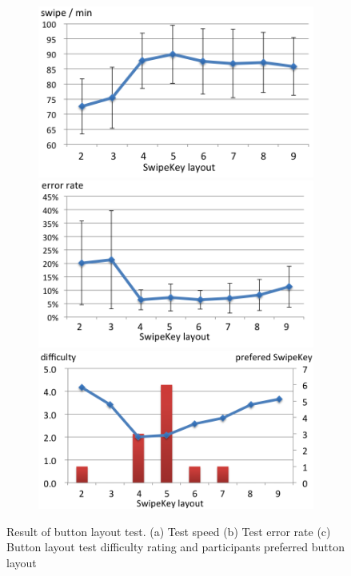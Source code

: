 \begin{figure}
  \begin{subfigure}{1\columnwidth}
  \centering
  \includegraphics[width=.8\columnwidth]{figures/F7-1.png}
  \caption{}
  \includegraphics[width=.8\columnwidth]{figures/F7-2.png}
  \caption{}
  \includegraphics[width=.8\columnwidth]{figures/F7-3.png}
  \caption{}
  \label{fig:f7}
  \end{subfigure}
  \caption{Result of button layout test. (a) Test speed (b) Test error rate (c) Button layout test difficulty rating and participants preferred button layout}
\end{figure}